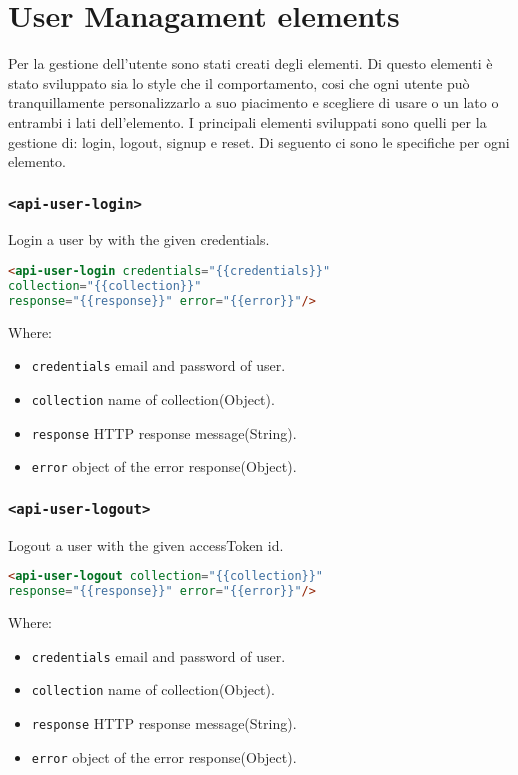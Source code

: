 \section{User Managament elements}

Per la gestione dell'utente sono stati creati degli elementi.
Di questo elementi è stato sviluppato sia lo style che il comportamento, cosi che ogni utente può tranquillamente personalizzarlo a suo piacimento
e scegliere di usare o un lato o entrambi i lati dell'elemento.
I principali elementi sviluppati sono quelli per la gestione di: login, logout, signup e reset.
Di seguento ci sono le specifiche per ogni elemento.

\subsubsection{\texttt{<api-user-login>}}

Login a user by with the given credentials.
\begin{lstlisting}[language=html]
<api-user-login credentials="{{credentials}}"
collection="{{collection}}" 
response="{{response}}" error="{{error}}"/>
\end{lstlisting}
Where:
\begin{itemize}
\item \texttt{credentials} email and password of user.
\item \texttt{collection} name of collection(Object).
\item \texttt{response}	HTTP response message(String).
\item \texttt{error} object of the error response(Object).
\end{itemize}

\subsubsection{\texttt{<api-user-logout>}}

Logout a user with the given accessToken id.
\begin{lstlisting}[language=html]
<api-user-logout collection="{{collection}}" 
response="{{response}}" error="{{error}}"/>
\end{lstlisting}
Where:
\begin{itemize}
\item \texttt{credentials} email and password of user.
\item \texttt{collection} name of collection(Object).
\item \texttt{response}	HTTP response message(String).
\item \texttt{error} object of the error response(Object).
\end{itemize}

